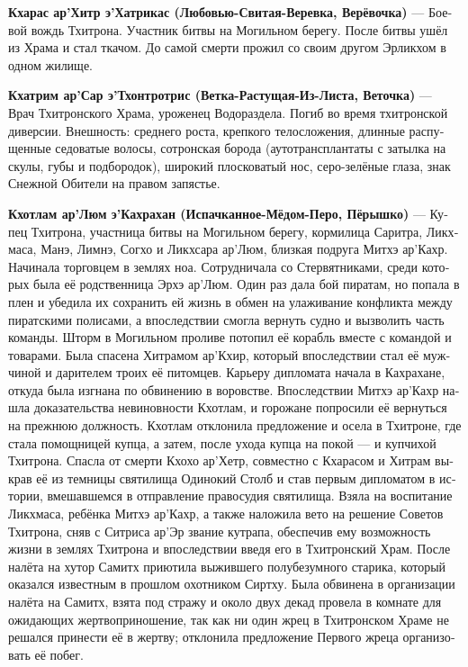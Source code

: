 \documentclass[a4paper,12pt,fleqn]{book}\usepackage{polyglossia}\setdefaultlanguage[babelshorthands=true]{russian}\setotherlanguage{english}\defaultfontfeatures{Ligatures=TeX,Mapping=tex-text}\usepackage{xcolor}\newcommand{\ml}[3]{#2}
\newcommand{\theterm}[3]{\textbf{\hypertarget{#1}{#2}} --- #3}
\begin{document}
{\theterm{kcharas}
{Кхарас ар’Хитр э’Хатрикас (Любовью-Свитая-Веревка, Верёвочка)}
{Боевой вождь Тхитрона.
Участник битвы на Могильном берегу.
После битвы ушёл из Храма и стал ткачом.
До самой смерти прожил со своим другом Эрликхом в одном жилище.}

\theterm{kchatrim}
{Кхатрим ар’Сар э’Тхонтротрис (Ветка-Растущая-Из-Листа, Веточка)}
{Врач Тхитронского Храма, уроженец Водораздела.
Погиб во время тхитронской диверсии.
Внешность: среднего роста, крепкого телосложения, длинные распущенные седоватые волосы, сотронская борода (аутотрансплантаты с затылка на скулы, губы и подбородок), широкий плосковатый нос, серо-зелёные глаза, знак Снежной Обители на правом запястье.}

\theterm{kchotlam}
{Кхотлам ар’Люм э’Кахрахан (Испачканное-Мёдом-Перо, Пёрышко)}
{Купец Тхитрона, участница битвы на Могильном берегу, кормилица Саритра, Ликхмаса, Манэ, Лимнэ, Согхо и Ликхсара ар'Люм, близкая подруга Митхэ ар'Кахр.
Начинала торговцем в землях ноа.
Сотрудничала со Стервятниками, среди которых была её родственница Эрхэ ар'Люм.
Один раз дала бой пиратам, но попала в плен и убедила их сохранить ей жизнь в обмен на улаживание конфликта между пиратскими полисами, а впоследствии смогла вернуть судно и вызволить часть команды.
Шторм в Могильном проливе потопил её корабль вместе с командой и товарами.
Была спасена Хитрамом ар'Кхир, который впоследствии стал её мужчиной и дарителем троих её питомцев.
Карьеру дипломата начала в Кахрахане, откуда была изгнана по обвинению в воровстве.
Впоследствии Митхэ ар'Кахр нашла доказательства невиновности Кхотлам, и горожане попросили её вернуться на прежнюю должность.
Кхотлам отклонила предложение и осела в Тхитроне, где стала помощницей купца, а затем, после ухода купца на покой --- и купчихой Тхитрона.
Спасла от смерти Кхохо ар'Хетр, совместно с Кхарасом и Хитрам выкрав её из темницы святилища Одинокий Столб и став первым дипломатом в истории, вмешавшемся в отправление правосудия святилища.
Взяла на воспитание Ликхмаса, ребёнка Митхэ ар'Кахр, а также наложила вето на решение Советов Тхитрона, сняв с Ситриса ар'Эр звание кутрапа, обеспечив ему возможность жизни в землях Тхитрона и впоследствии введя его в Тхитронский Храм.
После налёта на хутор Самитх приютила выжившего полубезумного старика, который оказался известным в прошлом охотником Сиртху.
Была обвинена в организации налёта на Самитх, взята под стражу и около двух декад провела в комнате для ожидающих жертвоприношение, так как ни один жрец в Тхитронском Храме не решался принести её в жертву;
отклонила предложение Первого жреца организовать её побег.
}}
\end{document}

